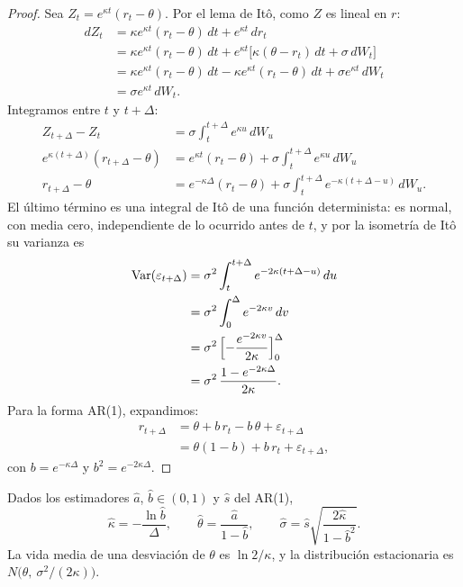 \begin{proof}
Sea $Z_t=e^{\kappa t}(r_t-\theta)$. Por el lema de Itô, como $Z$ es lineal en $r$:
\begin{align*}
  dZ_t &= \kappa e^{\kappa t}(r_t-\theta)\,dt+e^{\kappa t}\,dr_t\\
       &= \kappa e^{\kappa t}(r_t-\theta)\,dt+e^{\kappa t}\bigl[\kappa(\theta-r_t)\,dt+\sigma\,dW_t\bigr]\\
       &= \kappa e^{\kappa t}(r_t-\theta)\,dt-\kappa e^{\kappa t}(r_t-\theta)\,dt+\sigma e^{\kappa t}\,dW_t\\
       &= \sigma e^{\kappa t}\,dW_t .
\end{align*}
Integramos entre $t$ y $t+\Delta$:
\begin{align*}
  Z_{t+\Delta}-Z_t &= \sigma\int_t^{t+\Delta}e^{\kappa u}\,dW_u\\
  e^{\kappa(t+\Delta)}(r_{t+\Delta}-\theta) &= e^{\kappa t}(r_t-\theta)+\sigma\int_t^{t+\Delta}e^{\kappa u}\,dW_u\\
  r_{t+\Delta}-\theta &= e^{-\kappa\Delta}(r_t-\theta)+\sigma\int_t^{t+\Delta}e^{-\kappa(t+\Delta-u)}\,dW_u .
\end{align*}
El último término es una integral de Itô de una función determinista: es normal, con media cero, independiente de lo
ocurrido antes de $t$, y por la isometría de Itô su varianza es
\begin{align*}
  \operatorname{Var}(\varepsilon_{t+\Delta}) &= \sigma^2\int_t^{t+\Delta}e^{-2\kappa(t+\Delta-u)}\,du\\
                               &= \sigma^2\int_0^{\Delta}e^{-2\kappa v}\,dv\\
                               &= \sigma^2\,\Bigl[-\frac{e^{-2\kappa v}}{2\kappa}\Bigr]_0^{\Delta}\\
                               &= \sigma^2\,\frac{1-e^{-2\kappa\Delta}}{2\kappa}.
\end{align*}
Para la forma AR(1), expandimos:
\begin{align*}
  r_{t+\Delta} &= \theta+b\,r_t-b\,\theta+\varepsilon_{t+\Delta}\\
               &= \theta(1-b)+b\,r_t+\varepsilon_{t+\Delta},
\end{align*}
con $b=e^{-\kappa\Delta}$ y $b^2=e^{-2\kappa\Delta}$.
\end{proof}

\begin{corolario}\label{cor:vasicek}
Dados los estimadores $\hat a$, $\hat b\in(0,1)$ y $\hat s$ del AR(1),
\[
  \hat\kappa=-\frac{\ln\hat b}{\Delta},\qquad \hat\theta=\frac{\hat a}{1-\hat b},\qquad
  \hat\sigma=\hat s\sqrt{\frac{2\hat\kappa}{1-\hat b^2}} .
\]
La vida media de una desviación de $\theta$ es $\ln2/\kappa$, y la distribución estacionaria es
$N\bigl(\theta,\ \sigma^2/(2\kappa)\bigr)$.
\end{corolario}


